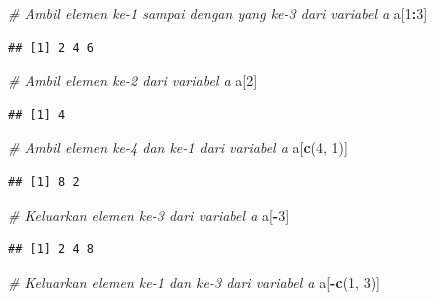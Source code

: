 \documentclass[openany]{book}
\newenvironment{Shaded}{\begin{snugshade}}{\end{snugshade}}
\newcommand{\KeywordTok}[1]{\textcolor[rgb]{0.13,0.29,0.53}{\textbf{#1}}}
\newcommand{\DecValTok}[1]{\textcolor[rgb]{0.00,0.00,0.81}{#1}}
\newcommand{\CommentTok}[1]{\textcolor[rgb]{0.56,0.35,0.01}{\textit{#1}}}
\newcommand{\OperatorTok}[1]{\textcolor[rgb]{0.81,0.36,0.00}{\textbf{#1}}}
\newcommand{\NormalTok}[1]{#1}
\begin{document}
\begin{Shaded}
\begin{Highlighting}[]
\CommentTok{# Ambil elemen ke-1 sampai dengan yang ke-3 dari variabel a}
\NormalTok{a[}\DecValTok{1}\OperatorTok{:}\DecValTok{3}\NormalTok{]}
\end{Highlighting}
\end{Shaded}

\begin{verbatim}
## [1] 2 4 6
\end{verbatim}

\begin{Shaded}
\begin{Highlighting}[]
\CommentTok{# Ambil elemen ke-2 dari variabel a}
\NormalTok{a[}\DecValTok{2}\NormalTok{]}
\end{Highlighting}
\end{Shaded}

\begin{verbatim}
## [1] 4
\end{verbatim}

\begin{Shaded}
\begin{Highlighting}[]
\CommentTok{# Ambil elemen ke-4 dan ke-1 dari variabel a}
\NormalTok{a[}\KeywordTok{c}\NormalTok{(}\DecValTok{4}\NormalTok{, }\DecValTok{1}\NormalTok{)]}
\end{Highlighting}
\end{Shaded}

\begin{verbatim}
## [1] 8 2
\end{verbatim}

\begin{Shaded}
\begin{Highlighting}[]
\CommentTok{# Keluarkan elemen ke-3 dari variabel a}
\NormalTok{a[}\OperatorTok{-}\DecValTok{3}\NormalTok{]}
\end{Highlighting}
\end{Shaded}

\begin{verbatim}
## [1] 2 4 8
\end{verbatim}

\begin{Shaded}
\begin{Highlighting}[]
\CommentTok{# Keluarkan elemen ke-1 dan ke-3 dari variabel a}
\NormalTok{a[}\OperatorTok{-}\KeywordTok{c}\NormalTok{(}\DecValTok{1}\NormalTok{, }\DecValTok{3}\NormalTok{)]}
\end{Highlighting}
\end{Shaded}
\end{document}
